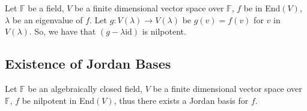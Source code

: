 \documentclass[a4paper, 12pt, twoside]{article}
\begin{document}
Let $\mathbb{F}$ be a field, $V$ be a finite dimensional vector space over $\mathbb{F}$, 
$f$ be in End$(V)$, $\lambda$ be an eigenvalue of $f$. Let $g: V(\lambda) \to V(\lambda)$
be $g(v) = f(v)$ for $v$ in $V(\lambda)$. So, we have that $(g - \lambda\text{id})$ is
nilpotent.

\subsection{Existence of Jordan Bases}

Let $\mathbb{F}$ be an algebraically closed field, $V$ be a finite dimensional 
vector space over $\mathbb{F}$, $f$ be nilpotent in End$(V)$, thus there exists a Jordan
basis for $f$.
\end{document}
